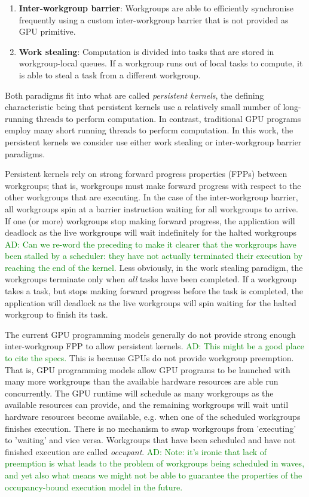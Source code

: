 \documentclass[nocopyrightspace]{sigplanconf-pldi16}
\newcommand{\ADComment}[1]{\textcolor{green}{AD: #1}}
\begin{document}
\begin{enumerate}
\item {\bf Inter-workgroup barrier}: Workgroups are able to
  efficiently synchronise frequently using a custom inter-workgroup
  barrier that is not provided as GPU primitive.

\item {\bf Work stealing}: Computation is divided into tasks that are
  stored in workgroup-local queues. If a workgroup runs out of local
  tasks to compute, it is able to steal a task from a different
  workgroup.
\end{enumerate}

Both paradigms fit into what are called \emph{persistent kernels}, the
defining characteristic being that persistent kernels use a relatively
small number of long-running threads to perform computation. In
contrast, traditional GPU programs employ many short running threads
to perform computation. In this work, the persistent kernels we consider
use either work stealing or inter-workgroup barrier paradigms.

Persistent kernels rely on strong forward progress properties (FPPs)
between workgroups; that is, workgroups must make forward progress with respect to
the other workgroups that are executing. In the case of the inter-workgroup barrier, all
workgroups spin at a barrier instruction waiting for all workgroups to
arrive. If one (or more) workgroups stop making forward progress, the
application will deadlock as the live workgroups will wait
indefinitely for the halted workgroups \ADComment{Can we re-word the preceding to make it clearer that the workgroups have been stalled by a scheduler: they have not actually terminated their execution by reaching the end of the kernel}. Less obviously, in the work
stealing paradigm, the workgroups terminate only when \emph{all} tasks
have been completed. If a workgroup takes a task, but stops making
forward progress before the task is completed, the application will
deadlock as the live workgroups will spin waiting for the halted
workgroup to finish its task.

The current GPU programming models generally do not provide strong
enough inter-workgroup FPP to allow persistent kernels. \ADComment{This might be a good place to cite the specs.}  This is
because GPUs do not provide workgroup preemption. That is, GPU
programming models allow GPU programs to be launched with many more
workgroups than the available hardware resources are able run
concurrently. The GPU runtime will schedule as many workgroups as the
available resources can provide, and the remaining workgroups will
wait until hardware resources become available, e.g.  when one of the
scheduled workgroups finishes execution. There is no mechanism to swap
workgroups from 'executing' to 'waiting' and vice versa. Workgroups
that have been scheduled and have not finished execution are called
\emph{occupant}.  \ADComment{Note: it's ironic that lack of preemption is what leads to the problem of workgroups being scheduled in waves, and yet also what means we might not be able to guarantee the properties of the occupancy-bound execution model in the future.}
\end{document}
